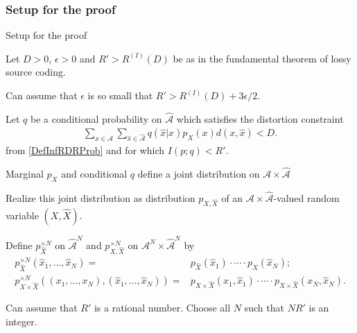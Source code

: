 \subsubsection{Setup for the proof} 
\begin{frame}{Setup for the proof}
\bit
\item Let $D>0$, $\epsilon>0$ and $R'>R^{(I)}(D)$ be as in the fundamental theorem of lossy source coding.
\item Can assume that $\epsilon$ is so small that $R'>R^{(I)}(D)+3\epsilon/2$.
\item Let $q$ be a conditional probability on $\hat{\mathcal{A}}$ which satisfies the distortion constraint
\begin{align*}
\sum_{x\in\mathcal{A}}\sum_{\hat{x}\in\hat{\mathcal{A}}}q(\hat{x}|x)p_X(x)d(x,\hat{x})<D. 
\end{align*}
from \eqref{DefInfRDRProb} and for which
$I(p;q)<R'$. 
\item Marginal $p_X$ and conditional $q$ define a joint distribution on $\mathcal{A}\times\hat{\mathcal{A}}$
\item Realize this joint distribution as distribution $p_{X,\hat{X}}$ of  
an $\mathcal{A}\times\hat{\mathcal{A}}$-valued random variable $(X,\hat{X})$. 
\item Define $p_{\hat{X}}^{\times N}$ on ${\hat{\mathcal{A}}}^N$ and  $p_{X,\hat{X}}^{\times N}$ on 
$\mathcal{A}^N\times\hat{{\mathcal{A}}}^N$ by
\begin{align}\label{DefJointII}
p_{\hat{X}}^{\times N}(\hat{x}_1,\dots,\hat{x}_N)=&p_{\hat{X}}(\hat{x}_1)\cdot \cdots\cdot p_{\hat{X}}(\hat{x}_N)\nonumber;
\\ p_{X\times\hat{X}}^{\times N}((x_1,\dots,x_N),(\hat{x}_1,\dots,\hat{x}_N))=&p_{X\times\hat{X}}(x_1,\hat{x}_1)\cdot \cdots\cdot p_{X\times\hat{X}}(x_N,\hat{x}_N).
\end{align}
\item Can assume that $R'$ is a rational number. Choose all $N$ such that $NR'$ is an integer.
\eit
\end{frame} 


